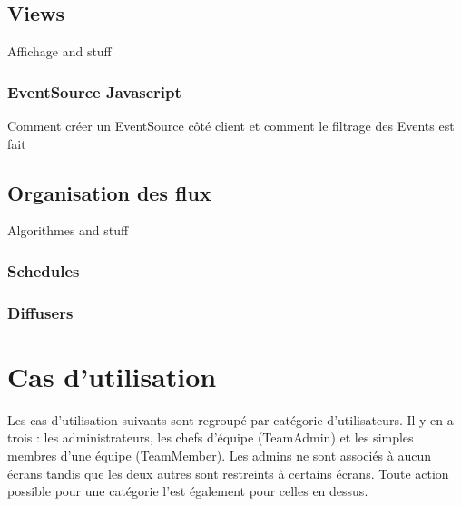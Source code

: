 \documentclass[french]{article}
\begin{document}
\subsection{Views}
Affichage and stuff

\subsubsection{EventSource Javascript}
Comment créer un EventSource côté client et comment le filtrage des Events est fait

\subsection{Organisation des flux}
Algorithmes and stuff

\subsubsection{Schedules}

\subsubsection{Diffusers}

	
	
\newpage		
\section{Cas d'utilisation}
Les cas d'utilisation suivants sont regroupé par catégorie d'utilisateurs. Il y en a trois : les administrateurs, les chefs d'équipe (TeamAdmin) et les simples membres d'une équipe (TeamMember). Les admins ne sont associés à aucun écrans tandis que les deux autres sont restreints à certains écrans.
Toute action possible pour une catégorie l'est également pour celles en dessus. 
\end{document}
